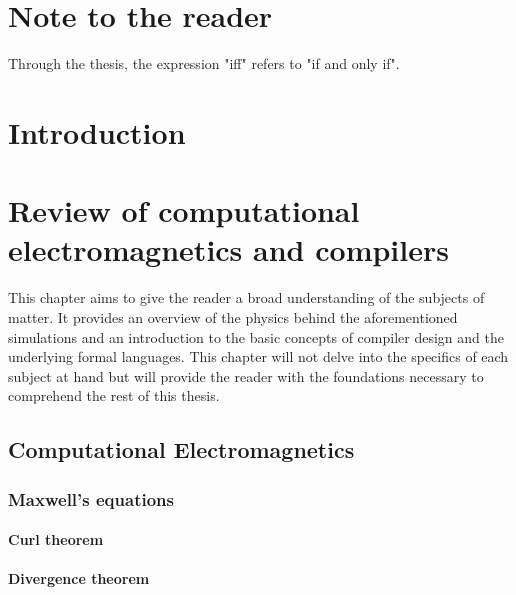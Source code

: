 
% 

\chapter{Note to the reader}
Through the thesis, the expression "iff" refers to "if and only if".

\chapter{Introduction}

\chapter{Review of computational electromagnetics and compilers}
This chapter aims to give the reader a broad understanding of the subjects of matter. It provides an overview of the physics behind the aforementioned simulations and an introduction to the basic concepts of compiler design and the underlying formal languages. This chapter will not delve into the specifics of each subject at hand but will provide the reader with the foundations necessary to comprehend the rest of this thesis.

\section{Computational Electromagnetics}
\subsection*{Maxwell's equations}
\subsubsection*{Curl theorem}
\subsubsection*{Divergence theorem}
